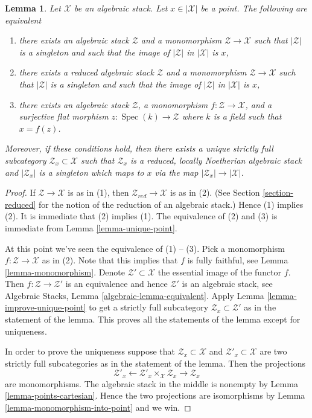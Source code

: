 \documentclass{stacks-project}
\theoremstyle{plain}
\newtheorem{lemma}[subsection]{Lemma}
\theoremstyle{definition}
\theoremstyle{remark}
\numberwithin{equation}{subsection}
\def\Spec{\mathop{\mathrm{Spec}}}
\begin{document}
\begin{lemma}
\label{lemma-residual-gerbe}
Let $\mathcal{X}$ be an algebraic stack. Let $x \in |\mathcal{X}|$ be a point.
The following are equivalent
\begin{enumerate}
\item there exists an algebraic stack $\mathcal{Z}$ and a monomorphism
$\mathcal{Z} \to \mathcal{X}$ such that $|\mathcal{Z}|$ is a singleton
and such that the image of $|\mathcal{Z}|$ in $|\mathcal{X}|$ is $x$,
\item there exists a reduced algebraic stack $\mathcal{Z}$ and a monomorphism
$\mathcal{Z} \to \mathcal{X}$ such that $|\mathcal{Z}|$ is a singleton
and such that the image of $|\mathcal{Z}|$ in $|\mathcal{X}|$ is $x$,
\item there exists an algebraic stack $\mathcal{Z}$, a monomorphism
$f : \mathcal{Z} \to \mathcal{X}$, and a surjective flat morphism
$z : \Spec(k) \to \mathcal{Z}$ where $k$ is a field such that
$x = f(z)$.
\end{enumerate}
Moreover, if these conditions hold, then there exists a unique
strictly full subcategory $\mathcal{Z}_x \subset \mathcal{X}$
such that $\mathcal{Z}_x$ is a reduced, locally Noetherian algebraic
stack and $|\mathcal{Z}_x|$ is a singleton which maps to $x$
via the map $|\mathcal{Z}_x| \to |\mathcal{X}|$.
\end{lemma}

\begin{proof}
If $\mathcal{Z} \to \mathcal{X}$ is as in (1), then
$\mathcal{Z}_{red} \to \mathcal{X}$ is as in (2). (See
Section \ref{section-reduced}
for the notion of the reduction of an algebraic stack.)
Hence (1) implies (2).
It is immediate that (2) implies (1).
The equivalence of (2) and (3) is immediate from
Lemma \ref{lemma-unique-point}.

\medskip\noindent
At this point we've seen the equivalence of (1) -- (3).
Pick a monomorphism $f : \mathcal{Z} \to \mathcal{X}$ as in (2).
Note that this implies that $f$ is fully faithful, see
Lemma \ref{lemma-monomorphism}.
Denote $\mathcal{Z}' \subset \mathcal{X}$ the essential image of the functor
$f$. Then $f : \mathcal{Z} \to \mathcal{Z}'$ is an equivalence and hence
$\mathcal{Z}'$ is an algebraic stack, see
Algebraic Stacks, Lemma \ref{algebraic-lemma-equivalent}.
Apply
Lemma \ref{lemma-improve-unique-point}
to get a strictly full subcategory $\mathcal{Z}_x \subset \mathcal{Z}'$
as in the statement of the lemma.
This proves all the statements of the lemma except for uniqueness.

\medskip\noindent
In order to prove the uniqueness suppose that
$\mathcal{Z}_x \subset \mathcal{X}$
and
$\mathcal{Z}'_x \subset \mathcal{X}$
are two strictly full subcategories as in the statement of the lemma.
Then the projections
$$
\mathcal{Z}'_x
\longleftarrow
\mathcal{Z}'_x \times_\mathcal{X} \mathcal{Z}_x
\longrightarrow
\mathcal{Z}_x
$$
are monomorphisms. The algebraic stack in the middle is nonempty by
Lemma \ref{lemma-points-cartesian}.
Hence the two projections are isomorphisms by
Lemma \ref{lemma-monomorphism-into-point}
and we win.
\end{proof}
\end{document}
